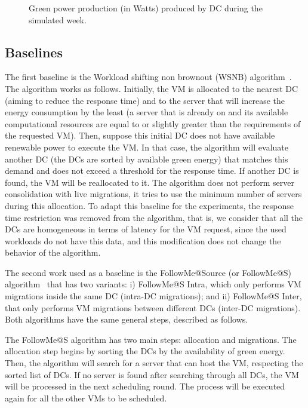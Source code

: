  \begin{figure}[h]
  \centering
   {}
  \caption{Green power production (in Watts) produced by DC during the
  simulated week.}
  \label{fig:green_power}
\end{figure}


\subsection{Baselines}
\label{sec:baselines_smartgreens}

The first baseline is the Workload shifting non brownout (WSNB) algorithm~\cite{XU2020191}. The algorithm works as follows. Initially, the VM is allocated to the nearest DC (aiming to reduce the response time) and to the server that will increase the energy consumption by the least (a server that is already on and its available computational resources are equal to or slightly greater than the requirements of the requested VM). Then, suppose this initial DC does not have available renewable power to execute the VM. In that case, the algorithm will evaluate another DC (the DCs are sorted by available green energy) that matches this demand and does not exceed a threshold for the response time. If another DC is found, the VM will be reallocated to it. The algorithm does not perform server consolidation with live migrations, it tries to use the minimum number of servers during this allocation. To adapt this baseline for the experiments, the response time restriction was removed from the algorithm, that is, we consider that all the DCs are homogeneous in terms of latency for the VM request, since the used workloads do not have this data, and this modification does not change the behavior of the algorithm.


The second work used as a baseline is the FollowMe@Source (or FollowMe@S) algorithm~\cite{ALI2021110907} that has two variants: i) FollowMe@S Intra, which only performs VM migrations inside the same DC (intra-DC migrations);  and ii) FollowMe@S Inter, that only performs VM migrations between different DCs (inter-DC migrations). Both algorithms have the same general steps, described as follows.

The FollowMe@S algorithm has two main steps: allocation and migrations. The allocation step begins by sorting the DCs by the availability of green energy. Then, the algorithm will search for a server that can host the VM, respecting the sorted list of DCs. If no server is found after searching through all DCs, the VM will be processed in the next scheduling round. The process will be executed again for all the other VMs to be scheduled. 


